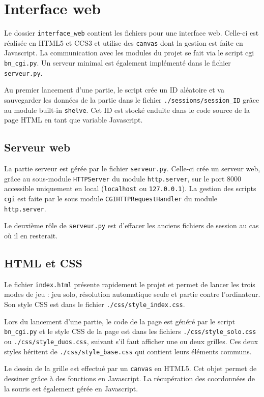 \chapter{Interface web}

Le dossier \texttt{interface\_web} contient les fichiers pour une interface web. Celle-ci est réalisée en HTML5 et CCS3 et utilise des \texttt{canvas} dont la gestion est faite en Javascript. La communication avec les modules du projet se fait via le script cgi \texttt{bn\_cgi.py}. Un serveur minimal est également implémenté dans le fichier \texttt{serveur.py}.

Au premier lancement d'une partie, le script crée un ID aléatoire et va sauvegarder les données de la partie dans le fichier \texttt{./sessions/session\_ID} grâce au module built-in \texttt{shelve}. Cet ID est stocké enduite dans le code source de la page HTML en tant que variable Javascript.

\section{Serveur web}
La partie serveur est gérée par le fichier \texttt{serveur.py}.
Celle-ci crée un serveur web, grâce au sous-module \texttt{HTTPServer} du module  \texttt{http.server}, sur le port 8000 accessible uniquement en local (\texttt{localhost} ou \texttt{127.0.0.1}). La gestion des scripts \texttt{cgi} est faite par le sous module \texttt{CGIHTTPRequestHandler} du module \texttt{http.server}.

Le deuxième rôle de \texttt{serveur.py} est d'effacer les anciens fichiers de session au cas où il en resterait.

\section{HTML et CSS}
Le fichier \texttt{index.html} présente rapidement le projet et permet de lancer les trois modes de jeu : jeu solo, résolution automatique seule et partie contre l'ordinateur. Son style CSS est dans le fichier \texttt{./css/style\_index.css}.

Lors du lancement d'une partie, le code de la page est généré par le script \texttt{bn\_cgi.py} et le style CSS de la page est dans les fichiers \texttt{./css/style\_solo.css} ou \texttt{./css/style\_duos.css}, suivant s'il faut afficher une ou deux grilles. Ces deux styles héritent de \texttt{./css/style\_base.css} qui contient leurs éléments communs.

Le dessin de la grille est effectué par un \texttt{canvas} en HTML5. Cet objet permet de dessiner grâce à des fonctions en Javascript. La récupération des coordonnées de la souris est également gérée en Javascript.

